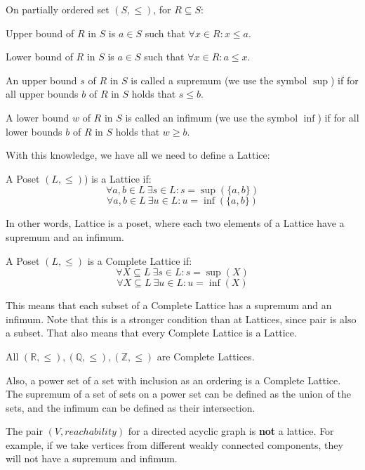 \begin{defn}
    On partially ordered set $(S, \leq)$, for $R \subseteq S$:

    Upper bound of $R$ in $S$ is $a \in S$ such that $\forall x \in R: x \leq a$.

    Lower bound of $R$ in $S$ is $a \in S$ such that $\forall x \in R: a \leq x$.

    An upper bound $s$ of $R$ in $S$ is called a supremum (we use the symbol $\sup$)
    if for all upper bounds $b$ of $R$ in $S$ holds that $s \leq b$.

    A lower bound $w$ of $R$ in $S$ is called an infimum (we use the symbol $\inf$)
    if for all lower bounds $b$ of $R$ in $S$ holds that $w \geq b$.
\end{defn}

With this knowledge, we have all we need to define a Lattice:
\begin{defn}[Lattice]
    A Poset $(L, \leq)$) is a Lattice if:
    \[\forall a, b \in L \: \exists s \in L: s = \sup(\{a,b\})\]
    \[\forall a, b \in L \: \exists u \in L: u = \inf(\{a,b\})\]
\end{defn}

In other words, Lattice is a poset, where each two elements of a Lattice have a supremum and an infimum.

\begin{defn}
    A Poset $(L, \leq)$ is a Complete Lattice if:
    \[\forall X \subseteq L \: \exists s \in L: s = \sup(X)\]
    \[\forall X \subseteq L \: \exists u \in L: u = \inf(X)\]
\end{defn}

This means that each subset of a Complete Lattice has a supremum and an infimum.
Note that this is a stronger condition than at Lattices, since pair is also a subset.
That also means that every Complete Lattice is a Lattice.

\begin{example}
    All $(\mathbb{R}, \leq), (\mathbb{Q}, \leq), (\mathbb{Z}, \leq)$ are Complete Lattices.

    Also, a power set of a set with inclusion as an ordering is a Complete Lattice.
    The supremum of a set of sets on a power set can be defined as the union of the sets, and the infimum can be defined
    as their intersection.

    The pair $(V, reachability)$ for a directed acyclic graph is \textbf{not} a lattice.
    For example, if we take vertices from different weakly connected components, they will not have a supremum and infimum.
\end{example}


